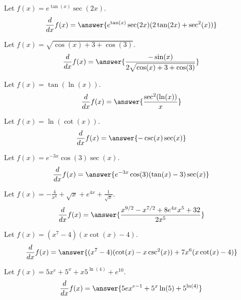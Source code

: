 \documentclass{ximera}
\begin{document}
\begin{shuffle}

\begin{exercise}
Let $f(x)=e^{\tan (x)} \sec (2 x)$.
\[
\ddx f(x) = \answer{e^{\tan (x)} \sec (2 x) (2 \tan (2 x)+\sec ^2(x))}
\]
\end{exercise}

\begin{exercise}
Let $f(x)=\sqrt{\cos (x)+3+\cos (3)}$.
\[
\ddx f(x) = \answer{\frac{-\sin (x)}{2 \sqrt{\cos (x)+3+\cos (3)}}}
\]
\end{exercise}

\begin{exercise}
Let $f(x)=\tan (\ln (x))$.
\[
\ddx f(x) = \answer{\frac{\sec ^2(\ln (x))}{x}}
\]
\end{exercise}

\begin{exercise}
Let $f(x)=\ln (\cot (x))$.
\[
\ddx f(x) = \answer{-\csc (x) \sec (x)}
\]
\end{exercise}

\begin{exercise}
Let $f(x)=e^{-3 x} \cos (3) \sec (x)$.
\[
\ddx f(x) = \answer{e^{-3 x} \cos (3) (\tan (x)-3) \sec (x)}
\]
\end{exercise}

\begin{exercise}
Let $f(x)=-\frac{4}{x^4}+\sqrt{x}+e^{4 x}+\frac{1}{\sqrt{x}}$.
\[
\ddx f(x) = \answer{\frac{x^{9/2}-x^{7/2}+8 e^{4 x} x^5+32}{2 x^5}}
\]
\end{exercise}

\begin{exercise}
Let $f(x)=(x^7-4) (x \cot (x)-4)$.
\[
\ddx f(x) = \answer{(x^7-4) (\cot (x)-x \csc ^2(x))+7 x^6 (x \cot (x)-4)}
\]
\end{exercise}

\begin{exercise}
Let $f(x)=5 x^e+5^x+x 5^{\ln (4)}+e^{10}$.
\[
\ddx f(x) = \answer{5 e x^{e-1}+5^x \ln (5)+5^{\ln (4)}}
\]
\end{exercise}



\end{shuffle}
\end{document}
